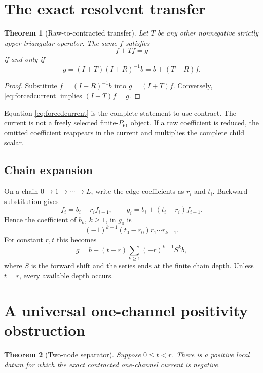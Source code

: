 \documentclass[11pt]{article}
\newtheorem{theorem}{Theorem}[section]
\newcommand{\1}{\mathbf 1}
\begin{document}
\section{The exact resolvent transfer}

\begin{theorem}[Raw-to-contracted transfer]
\label{thm:transfer}
Let $T$ be any other nonnegative strictly upper-triangular operator.  The same
$f$ satisfies
\[
 f+Tf=g
\]
if and only if
\begin{equation}
 \boxed{
 g=(I+T)(I+R)^{-1}b=b+(T-R)f.
 }
 \label{eq:forcedcurrent}
\end{equation}
\end{theorem}

\begin{proof}
Substitute $f=(I+R)^{-1}b$ into $g=(I+T)f$.  Conversely,
\eqref{eq:forcedcurrent} implies $(I+T)f=g$.
\end{proof}

Equation \eqref{eq:forcedcurrent} is the complete statement-to-use contract.
The current is not a freely selected finite-$P_{61}$ object.  If a raw
coefficient is reduced, the omitted coefficient reappears in the current and
multiplies the complete child scalar.

\subsection{Chain expansion}

On a chain $0\to1\to\cdots\to L$, write the edge coefficients as $r_i$ and
$t_i$.  Backward substitution gives
\[
 f_i=b_i-r_if_{i+1},
 \qquad
 g_i=b_i+(t_i-r_i)f_{i+1}.
\]
Hence the coefficient of $b_k$, $k\ge1$, in $g_0$ is
\begin{equation}
 \boxed{
 (-1)^{k-1}(t_0-r_0)r_1\cdots r_{k-1}.
 }
 \label{eq:chaincoef}
\end{equation}
For constant $r,t$ this becomes
\begin{equation}
 g=b+(t-r)\sum_{k\ge1}(-r)^{k-1}S^kb,
 \label{eq:nonlocalseries}
\end{equation}
where $S$ is the forward shift and the series ends at the finite chain depth.
Unless $t=r$, every available depth occurs.

\section{A universal one-channel positivity obstruction}

\begin{theorem}[Two-node separator]
\label{thm:separator}
Suppose $0\le t<r$.  There is a positive local datum for which the exact
contracted one-channel current is negative.
\end{theorem}
\end{document}
